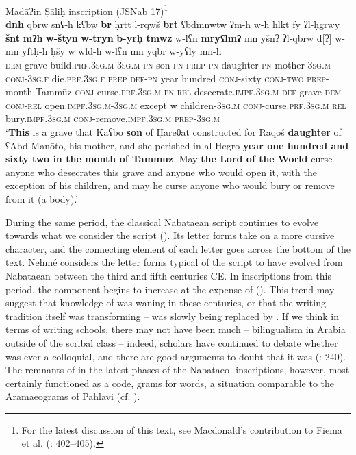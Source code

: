 \documentclass[output=paper]{langsci/langscibook}
\begin{document}
\ea Madāʔin Ṣāliḥ inscription (JSNab 17)\footnote{For the latest discussion of this text, see Macdonald’s contribution to Fiema et al. (\citeyear{Fiemaetal2015}: 402--405).}\label{Raqosh}\\ 
\gll   \textbf{dnh} qbrw ṣnʕ-h kʕbw \textbf{br} ḥrtt l-rqwš \textbf{brt} ʕbdmnwtw ʔm-h w-h hlkt fy ʔl-ḥgrwy \textbf{šnt} \textbf{mʔh} \textbf{w-štyn} \textbf{w-tryn} \textbf{b-yrḥ} \textbf{tmwz} w-lʕn \textbf{mryʕlmʔ} mn yšnʔ ʔl-qbrw d[ʔ] 	w-mn 		yftḥ-h ḥšy w wld-h w-lʕn mn yqbr w-{y}ʕly mn-h \\
       \textsc{dem} grave build.\textsc{prf.3sg.m-3sg.m} \textsc{pn} son \textsc{pn} \textsc{prep-pn} daughter \textsc{pn} mother-\textsc{3sg.m} \textsc{conj-3sg.f} die.\textsc{prf.3sg.f} \textsc{prep} \textsc{def-pn} year hundred \textsc{conj}-sixty \textsc{conj-two} \textsc{prep}-month Tammūz \textsc{conj}-curse.\textsc{prf.3sg.m} \textsc{pn} \textsc{rel} desecrate.\textsc{impf.3sg.m} \textsc{def}-grave \textsc{dem} \textsc{conj-rel} open.\textsc{impf.3sg.m-3sg.m} except w children-\textsc{3sg.m} \textsc{conj}-curse.\textsc{prf.3sg.m} \textsc{rel} bury.\textsc{impf.3sg.m} \textsc{conj}-remove.\textsc{impf.3sg.m} \textsc{prep-3sg.m} \\
\glt   `\textbf{This} is a grave that Kaʕbo \textbf{son} of Ḥāreθat constructed for Raqōś \textbf{daughter} of ʕAbd-Manōto, his mother, and she perished in al-Ḥegro \textbf{year one hundred and sixty two in the month of Tammūz}. May \textbf{the Lord of the World}  curse anyone who desecrates this grave and anyone who would open it, with the exception of his children, and may he curse anyone who would bury or remove from it (a body).'\\
\z

During the same period, the classical Nabataean script continues to evolve towards what we consider the  script (\citealt{Nehmé2010}). Its letter forms take on a more cursive character, and the connecting element of each letter goes across the bottom of the text. Nehmé considers the letter forms typical of the  script to have evolved from Nabataean between the third and fifth centuries CE. In inscriptions from this period, the  component begins to increase at the expense of  (\citealt{Nehmé2017}). This trend may suggest that knowledge of  was waning in these centuries, or that the writing tradition itself was transforming –  was slowly being replaced by . If we think in terms of writing schools, there may not have been much -- {bilingualism} in Arabia outside of the scribal class – indeed, scholars have continued to debate whether  was ever a colloquial, and there are good arguments to doubt that it was (\citealt{Gzella2015}: 240). The remnants of  in the latest phases of the Nabataeo- inscriptions, however, most certainly functioned as a code, grams for  words, a situation comparable to the Aramaeograms of Pahlavi (cf. \citealt{Nyberg1974}).
\end{document}
